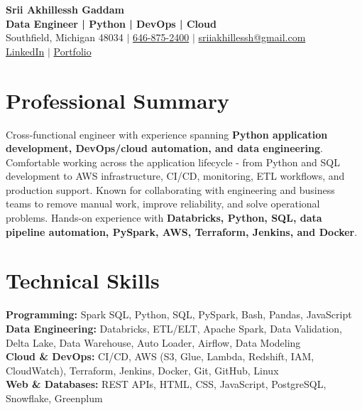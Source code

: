 \documentclass[letterpaper,10pt]{article}
\begin{document}
\fontsize{9.35pt}{10.45pt}\selectfont

\begin{center}
    {\LARGE \textbf{Srii Akhillessh Gaddam}} \\[-1pt]
    \textbf{Data Engineer | Python | DevOps | Cloud} \\[2pt]
    Southfield, Michigan 48034 $|$
    \href{tel:6468752400}{646-875-2400} $|$
    \href{mailto:sriiakhillessh@gmail.com}{sriiakhillessh@gmail.com} \\[1pt]
    \href{https://www.linkedin.com/in/srii-akhiilessh-gaddam-b48668191/}{LinkedIn} $|$
    \href{https://sriiakhillesshg.github.io/portfolio/}{Portfolio}
\end{center}
\vspace{-8pt}

\section{Professional Summary}
\small{Cross-functional engineer with experience spanning \textbf{Python application development, DevOps/cloud automation, and data engineering}. Comfortable working across the application lifecycle - from Python and SQL development to AWS infrastructure, CI/CD, monitoring, ETL workflows, and production support. Known for collaborating with engineering and business teams to remove manual work, improve reliability, and solve operational problems. Hands-on experience with \textbf{Databricks, Python, SQL, data pipeline automation, PySpark, AWS, Terraform, Jenkins, and Docker}.}

\section{Technical Skills}
\small{
\textbf{Programming:} Spark SQL, Python, SQL, PySpark, Bash, Pandas, JavaScript \\
\textbf{Data Engineering:} Databricks, ETL/ELT, Apache Spark, Data Validation, Delta Lake, Data Warehouse, Auto Loader, Airflow, Data Modeling \\
\textbf{Cloud \& DevOps:} CI/CD, AWS (S3, Glue, Lambda, Redshift, IAM, CloudWatch), Terraform, Jenkins, Docker, Git, GitHub, Linux \\
\textbf{Web \& Databases:} REST APIs, HTML, CSS, JavaScript, PostgreSQL, Snowflake, Greenplum
}
\end{document}
